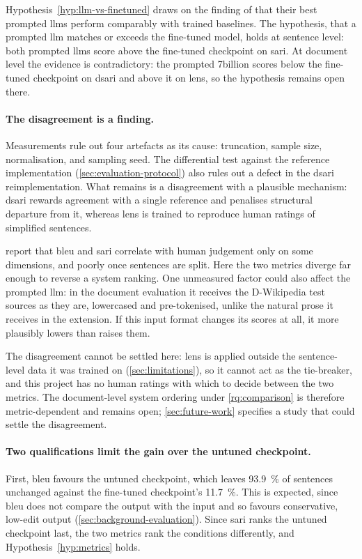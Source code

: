 \pagebreak

Hypothesis~\cref{hyp:llm-vs-finetuned} draws on the finding of \textcite[13291]{kew-etal-2023-bless} that their best prompted \glspl{llm} perform comparably with trained baselines.
The hypothesis, that a prompted \gls{llm} matches or exceeds the fine-tuned model, holds at sentence level: both prompted \glspl{llm} score above the fine-tuned checkpoint on \gls{sari}.
At document level the evidence is contradictory: the prompted 7\gls{billion} scores below the fine-tuned checkpoint on \gls{dsari} and above it on \gls{lens}, so the hypothesis remains open there.

\paragraph{The disagreement is a finding.}
Measurements rule out four artefacts as its cause: truncation, sample size, normalisation, and sampling seed.
The differential test against the reference implementation (\cref{sec:evaluation-protocol}) also rules out a defect in the \gls{dsari} reimplementation.
What remains is a disagreement with a plausible mechanism: \gls{dsari} rewards agreement with a single reference and penalises structural departure from it, whereas \gls{lens} is trained to reproduce human ratings of simplified sentences.

\textcite[148, 150--151]{alva-manchego-etal-2020-survey} report that \gls{bleu} and \gls{sari} correlate with human judgement only on some dimensions, and poorly once sentences are split.
Here the two metrics diverge far enough to reverse a system ranking.
One unmeasured factor could also affect the prompted \gls{llm}: in the document evaluation it receives the D-Wikipedia test sources as they are, lowercased and pre-tokenised, unlike the natural prose it receives in the extension.
If this input format changes its scores at all, it more plausibly lowers than raises them.

The disagreement cannot be settled here: \gls{lens} is applied outside the sentence-level data it was trained on (\cref{sec:limitations}), so it cannot act as the tie-breaker, and this project has no human ratings with which to decide between the two metrics.
The document-level system ordering under \cref{rq:comparison} is therefore metric-dependent and remains open; \cref{sec:future-work} specifies a study that could settle the disagreement.

\paragraph{Two qualifications limit the gain over the untuned checkpoint.}
First, \gls{bleu} favours the untuned checkpoint, which leaves \qty{93.9}{\percent} of sentences unchanged against the fine-tuned checkpoint's \qty{11.7}{\percent}.
This is expected, since \gls{bleu} does not compare the output with the input and so favours conservative, low-edit output (\cref{sec:background-evaluation}).
Since \gls{sari} ranks the untuned checkpoint last, the two metrics rank the conditions differently, and Hypothesis~\cref{hyp:metrics} holds.

